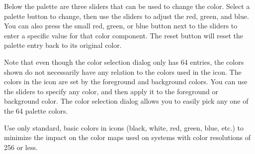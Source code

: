 Below the palette are three sliders that can be used to
change the color. Select a palette button to change, then
use the sliders to adjust the red, green, and blue. You
can also press the small red, green, or blue button
next to the sliders to enter a specific value for that
color component. The reset button will reset the palette
entry back to its original color.

Note that even though the color selection dialog only
has 64 entries, the colors shown do not necessarily have
any relation to the colors used in the icon. The colors
in the icon are set by the foreground and background
colors. You can use the sliders to specify any color,
and then apply it to the foreground or background color.
The color selection dialog allows you to easily
pick any one of the 64 palette colors.

Use only standard, basic colors in icons (black, white, red,
green, blue, etc.) to minimize the impact on the color maps used
on systems with color resolutions of 256 or less.
